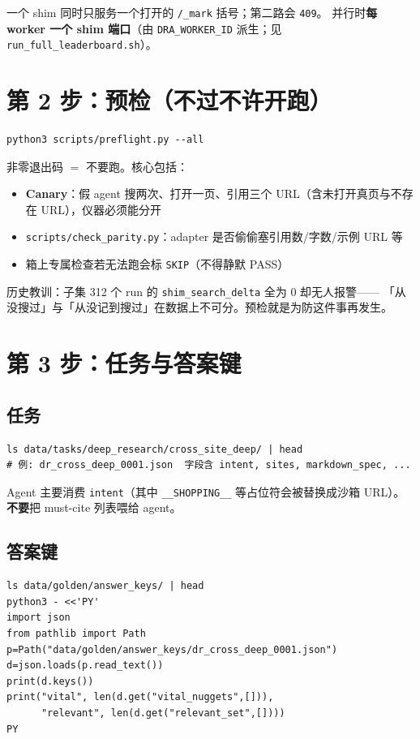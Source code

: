 \documentclass[10.5pt,a4paper]{article}
\begin{document}
一个 shim 同时只服务一个打开的 \texttt{/\_mark} 括号；第二路会 \texttt{409}。
并行时\textbf{每 worker 一个 shim 端口}（由 \texttt{DRA\_WORKER\_ID} 派生；见 \texttt{run\_full\_leaderboard.sh}）。

\section{第 2 步：预检（不过不许开跑）}\label{sec:preflight}

\begin{lstlisting}
python3 scripts/preflight.py --all
\end{lstlisting}

非零退出码 $=$ 不要跑。核心包括：
\begin{itemize}
  \item \textbf{Canary}：假 agent 搜两次、打开一页、引用三个 URL（含未打开真页与不存在 URL），仪器必须能分开
  \item \texttt{scripts/check\_parity.py}：adapter 是否偷偷塞引用数/字数/示例 URL 等
  \item 箱上专属检查若无法跑会标 \texttt{SKIP}（不得静默 PASS）
\end{itemize}

历史教训：子集 312 个 run 的 \texttt{shim\_search\_delta} 全为 0 却无人报警——
「从没搜过」与「从没记到搜过」在数据上不可分。预检就是为防这件事再发生。

\section{第 3 步：任务与答案键}

\subsection{任务}

\begin{lstlisting}
ls data/tasks/deep_research/cross_site_deep/ | head
# 例: dr_cross_deep_0001.json  字段含 intent, sites, markdown_spec, ...
\end{lstlisting}

Agent 主要消费 \texttt{intent}（其中 \texttt{\_\_SHOPPING\_\_} 等占位符会被替换成沙箱 URL）。
\textbf{不要}把 must-cite 列表喂给 agent。

\subsection{答案键}

\begin{lstlisting}
ls data/golden/answer_keys/ | head
python3 - <<'PY'
import json
from pathlib import Path
p=Path("data/golden/answer_keys/dr_cross_deep_0001.json")
d=json.loads(p.read_text())
print(d.keys())
print("vital", len(d.get("vital_nuggets",[])),
      "relevant", len(d.get("relevant_set",[])))
PY
\end{lstlisting}
\end{document}
